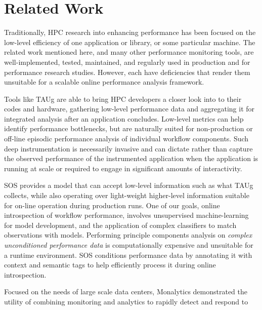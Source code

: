 
\section{Related Work}
%
Traditionally, HPC research into enhancing performance has been
focused on the low-level efficiency of one application or library, or
some particular machine.
%
The related work mentioned here, and many other performance monitoring
tools, are well-implemented, tested, maintained, and regularly used
in production and for performance research studies.
%
However, each have deficiencies that render them unsuitable for a scalable
online performance analysis framework.
%
\par
%
Tools like TAUg \cite{huck2006taug} are able to bring HPC developers a closer look into to
their codes and hardware, gathering low-level performance data and
aggregating it for integrated analysis after an application concludes.
%
Low-level metrics can help identify performance bottlenecks, but are
naturally suited for non-production or off-line episodic performance
analysis of individual workflow components.
%
Such deep instrumentation is necessarily invasive and can dictate
rather than capture the observed performance of the instrumented
application when the application is running at scale or required to
engage in significant amounts of interactivity.
%
\par
%
SOS provides a model that can accept low-level information such as
what TAUg collects, while also operating over light-weight higher-level
information suitable for on-line operation during production runs.
%
One of our goals, online introspection of workflow performance,
involves unsupervised machine-learning for model development, and the
application of complex classifiers to match observations with models.
%
Performing principle components analysis on \textit{complex unconditioned
  performance data} is computationally expensive and unsuitable for a
runtime environment.
%
SOS conditions performance data by annotating it with context and
semantic tags to help efficiently process it during online
introspection.
%
\par
%
Focused on the needs of large scale data centers, Monalytics
\cite{kutare2010monalytics} demonstrated the utility of
combining monitoring and analytics to rapidly detect and respond to
